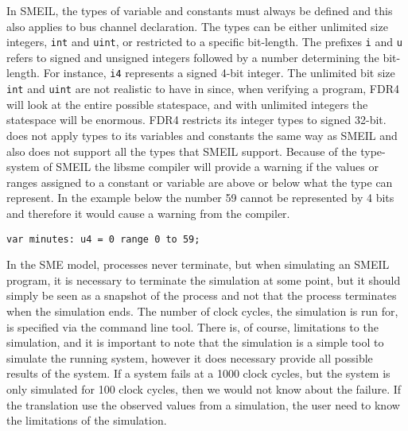 In SMEIL, the types of variable and constants must always be defined and this also applies to bus channel declaration. The types can be either unlimited size integers, \texttt{int} and \texttt{uint}, or restricted to a specific bit-length. The prefixes \texttt{i} and \texttt{u} refers to signed and unsigned integers followed by a number determining the bit-length. For instance, \texttt{i4} represents a signed 4-bit integer.
The unlimited bit size \texttt{int} and \texttt{uint} are not realistic to have in \cspm since, when verifying a program, FDR4 will look at the entire possible statespace, and with unlimited integers the statespace will be enormous. FDR4 restricts its integer types to signed 32-bit\cite{UniversityofOxford}. \cspm does not apply types to its variables and constants the same way as SMEIL and \cspm also does not support all the types that SMEIL support.
Because of the type-system of SMEIL the libsme compiler will provide a warning if the values or ranges assigned to a constant or variable are above or below what the type can represent. In the example below the number 59 cannot be represented by 4 bits and therefore it would cause a warning from the compiler.
\begin{verbatim}
var minutes: u4 = 0 range 0 to 59;
\end{verbatim}

In the SME model, processes never terminate, but when simulating an SMEIL program, it is necessary to terminate the simulation at some point, but it should simply be seen as a snapshot of the process and not that the process terminates when the simulation ends.
The number of clock cycles, the simulation is run for, is specified via the command line tool.
There is, of course, limitations to the simulation, and it is important to note that the simulation is a simple tool to simulate the running system, however it does necessary provide all possible results of the system. If a system fails at a 1000 clock cycles, but the system is only simulated for 100 clock cycles, then we would not know about the failure. If the translation use the observed values from a simulation, the user need to know the limitations of the simulation.

